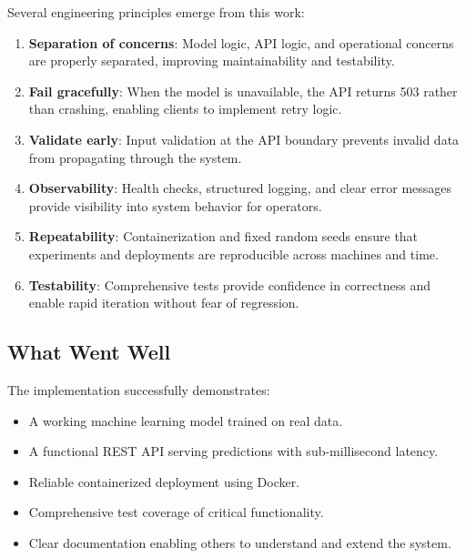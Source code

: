 Several engineering principles emerge from this work:

\begin{enumerate}
  \item \textbf{Separation of concerns}: Model logic, API logic, and operational concerns are properly 
  separated, improving maintainability and testability.
  
  \item \textbf{Fail gracefully}: When the model is unavailable, the API returns 503 rather than crashing, 
  enabling clients to implement retry logic.
  
  \item \textbf{Validate early}: Input validation at the API boundary prevents invalid data from 
  propagating through the system.
  
  \item \textbf{Observability}: Health checks, structured logging, and clear error messages provide 
  visibility into system behavior for operators.
  
  \item \textbf{Repeatability}: Containerization and fixed random seeds ensure that experiments and 
  deployments are reproducible across machines and time.
  
  \item \textbf{Testability}: Comprehensive tests provide confidence in correctness and enable rapid 
  iteration without fear of regression.
\end{enumerate}

\subsection{What Went Well}

The implementation successfully demonstrates:

\begin{itemize}
  \item A working machine learning model trained on real data.
  
  \item A functional REST API serving predictions with sub-millisecond latency.
  
  \item Reliable containerized deployment using Docker.
  
  \item Comprehensive test coverage of critical functionality.
  
  \item Clear documentation enabling others to understand and extend the system.
\end{itemize}

